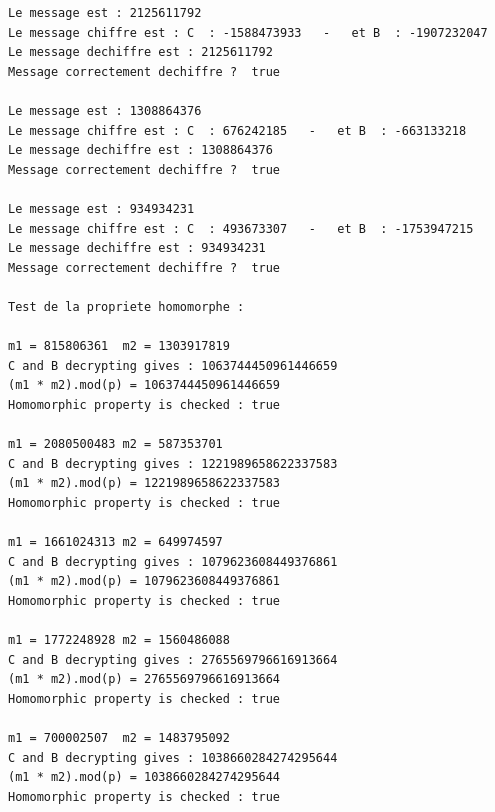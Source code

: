 \documentclass[a4paper,11pt]{article}
\begin{document}
\begin{lstlisting}[caption ={le fichier test.txt}, captionpos=b,breaklines = true]
Le message est : 2125611792
Le message chiffre est : C  : -1588473933   -   et B  : -1907232047
Le message dechiffre est : 2125611792
Message correctement dechiffre ?  true

Le message est : 1308864376
Le message chiffre est : C  : 676242185   -   et B  : -663133218
Le message dechiffre est : 1308864376
Message correctement dechiffre ?  true

Le message est : 934934231
Le message chiffre est : C  : 493673307   -   et B  : -1753947215
Le message dechiffre est : 934934231
Message correctement dechiffre ?  true

Test de la propriete homomorphe : 

m1 = 815806361	m2 = 1303917819
C and B decrypting gives : 1063744450961446659
(m1 * m2).mod(p) = 1063744450961446659
Homomorphic property is checked : true

m1 = 2080500483	m2 = 587353701
C and B decrypting gives : 1221989658622337583
(m1 * m2).mod(p) = 1221989658622337583
Homomorphic property is checked : true

m1 = 1661024313	m2 = 649974597
C and B decrypting gives : 1079623608449376861
(m1 * m2).mod(p) = 1079623608449376861
Homomorphic property is checked : true

m1 = 1772248928	m2 = 1560486088
C and B decrypting gives : 2765569796616913664
(m1 * m2).mod(p) = 2765569796616913664
Homomorphic property is checked : true

m1 = 700002507	m2 = 1483795092
C and B decrypting gives : 1038660284274295644
(m1 * m2).mod(p) = 1038660284274295644
Homomorphic property is checked : true

        \end{lstlisting}
\end{document}
